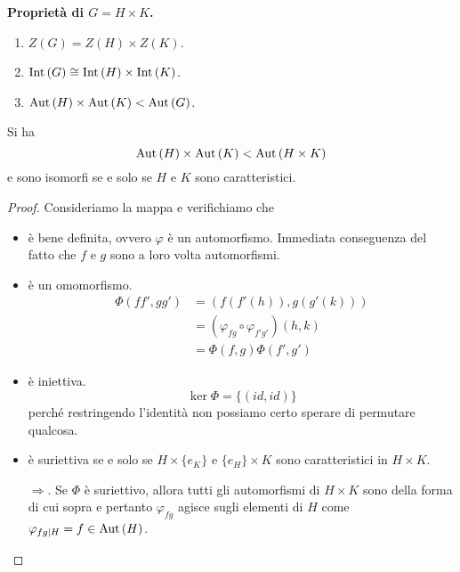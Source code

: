 \begin{multicols}{2}
\textbf{Proprietà di $ G = H \times K $.}
\begin{enumerate}
	\item $ Z(G) = Z(H) \times Z(K) $.
	\item $ \mathrm{Int}\left( G \right) \cong \mathrm{Int}\left( H \right) \times \mathrm{Int}\left( K \right) $.
	\item $ \mathrm{Aut}\left( H \right) \times \mathrm{Aut}\left( K \right) < \mathrm{Aut}\left( G \right) $.
\end{enumerate}
\begin{theorem}
	Si ha $$  \mathrm{Aut}\left( H \right) \times \mathrm{Aut}\left( K \right) < \mathrm{Aut}\left( H \times K \right)  $$ e sono isomorfi se e solo se $ H $ e $ K $ sono caratteristici.
\end{theorem}
\begin{proof}
	Consideriamo la mappa 
	e verifichiamo che
	\begin{itemize}
		\item è bene definita, ovvero $ \varphi $ è un automorfismo. Immediata conseguenza del fatto che $ f $ e $ g $ sono a loro volta automorfismi.
		\item è un omomorfismo.  \begin{align*}
			\Phi(ff',gg') &= \left( f(f'(h)), g(g'(k)) \right)\\& = (\varphi_{fg} \circ \varphi_{f'g'})(h, k) \\&= \Phi(f, g)\Phi(f',g') 
		\end{align*}
		\item è iniettiva.
		\[ \ker\Phi = \{ (id, id) \} \]
		perché restringendo l'identità non possiamo certo sperare di permutare qualcosa.
		
		\item è suriettiva se e solo se $ H\times\{e_K\} $ e $ \{e_H\}\times K $ sono caratteristici in $ H \times K $.
		
		$ \Rightarrow $. Se $ \Phi $ è suriettivo, allora tutti gli automorfismi di $ H \times K $ sono della forma di cui sopra e pertanto $ \varphi_{fg} $ agisce sugli elementi di $ H $ come $ \varphi_{fg|H} = f \in \mathrm{Aut}\left( H \right) $.
		

\end{itemize}
\end{proof}
\end{multicols}
